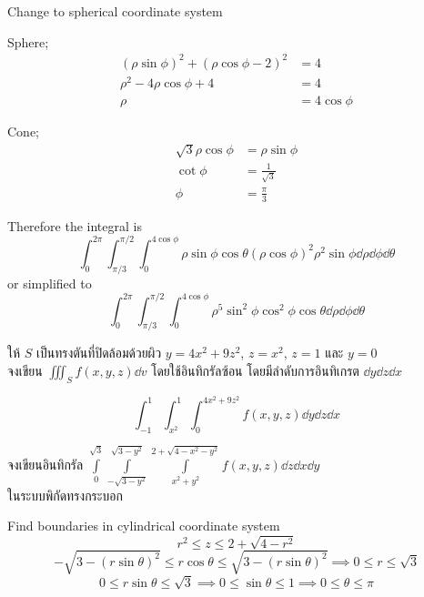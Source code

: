 \documentclass[12pt,final]{novelette} %
\begin{document}
\begin{question}
\begin{question}
        \bigskip
        Change to spherical coordinate system

        Sphere;
        \begin{align*}
            (\rho \sin \phi)^2 + (\rho \cos \phi - 2)^2 & = 4           \\
            \rho^2 - 4 \rho \cos \phi + 4               & = 4           \\
            \rho                                        & = 4 \cos \phi
        \end{align*}

        Cone;
        \begin{align*}
            \sqrt3 \rho \cos \phi & = \rho \sin \phi \\
            \cot \phi             & = \frac1{\sqrt3} \\
            \phi                  & = \frac{\pi}{3}
        \end{align*}

        Therefore the integral is
        $$
            \int_0^{2\pi} \int_{\pi/3}^{\pi/2} \int_0^{4\cos\phi} \rho \sin\phi \cos\theta (\rho \cos\phi)^2 \rho^2 \sin\phi \dd{\rho} \dd{\phi} \dd{\theta}
        $$
        or simplified to
        $$
            \boxed{\int_0^{2\pi} \int_{\pi/3}^{\pi/2} \int_0^{4\cos\phi} \rho^5 \sin^2\phi \cos^2\phi \cos\theta \dd{\rho} \dd{\phi} \dd{\theta}}
        $$

        \item
        ให้ $S$ เป็นทรงตันที่ปิดล้อมด้วยผิว $y = 4x^2 + 9z^2$, $z = x^2$, $z = 1$ และ $y = 0$ \\
        จงเขียน $\iiint_S f(x, y, z) \dd{v}$ โดยใช้อินทิกรัลซ้อน โดยมีลำดับการอินทิเกรต $\dd{y} \dd{z} \dd{x}$ 

        \bigskip
        $$
            \boxed{\int_{-1}^1 \int_{x^2}^1 \int_0^{4x^2+9z^2} f(x, y, z) \dd{y} \dd{z} \dd{x}}
        $$

        \item
        จงเขียนอินทิกรัล \quad $\displaystyle \int\limits_0^{\sqrt3} \int\limits_{-\sqrt{3-y^2}}^{\sqrt{3-y^2}} \int\limits_{x^2+y^2}^{2+\sqrt{4-x^2-y^2}} f(x, y, z) \dd{z}\dd{x}\dd{y}$ \\[.5em]
        ในระบบพิกัดทรงกระบอก 

        \bigskip
        Find boundaries in cylindrical coordinate system
        $$ r^2 \leq z \leq 2 + \sqrt{4 - r^2} $$
        $$ -\sqrt{3-(r\sin\theta)^2} \leq r \cos\theta \leq \sqrt{3-(r\sin\theta)^2} \implies 0 \leq r \leq \sqrt3 $$
        $$ 0 \leq r \sin\theta \leq \sqrt3 \implies 0 \leq \sin\theta \leq 1 \implies 0 \leq \theta \leq \pi $$


\end{question}
\end{question}
\end{document}
